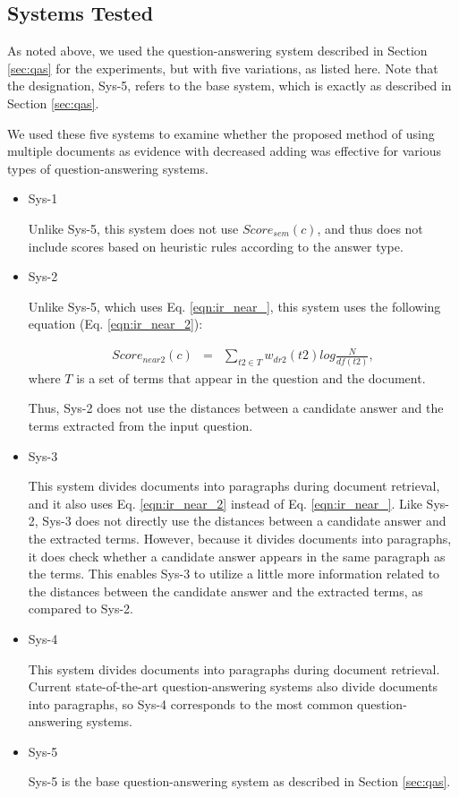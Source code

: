 \subsection{Systems Tested}
\label{sec:exp_system}

As noted above, we used the question-answering system 
described in Section \ref{sec:qas} for the experiments, 
but with five variations, as listed here. 
Note that the designation, Sys-5, refers to the base system, which is exactly as described in Section \ref{sec:qas}. 

We used these five systems 
to examine whether the proposed method
of using multiple documents as evidence with decreased adding
was effective for various types of question-answering systems. 

\begin{itemize}
\item 
  Sys-1
  
  Unlike Sys-5, this system does not use $Score_{sem}(c)$, and
  thus does not include scores based on heuristic rules according to the answer type.

\item 
  Sys-2

  Unlike Sys-5, which uses Eq. \ref{eqn:ir_near_}, 
  this system uses the following equation (Eq. \ref{eqn:ir_near_2}):
  
{
\begin{eqnarray}
  \label{eqn:ir_near_2}
Score_{near2}(c) & =  & \displaystyle \sum_{t2 \in T} w_{dr2}(t2) log \frac{N}{df(t2)}, 
\end{eqnarray}}
where $T$ is a set of terms that appear in the question and the document.

Thus, Sys-2 does not use 
the distances between a candidate answer and the terms extracted from the input question. 

\item 
  Sys-3

  This system divides documents into paragraphs during document retrieval, 
  and it also uses Eq. \ref{eqn:ir_near_2} instead of Eq. \ref{eqn:ir_near_}. 
  Like Sys-2, Sys-3 does not directly use 
  the distances between a candidate answer and the extracted terms. 
  However, because it divides documents into paragraphs, 
  it does check whether a candidate answer appears in the same paragraph as the terms. 
  This enables 
  Sys-3 to utilize a little more information related to 
  the distances between the candidate answer and the extracted terms, as compared to Sys-2. 

\item 
  Sys-4

  This system divides documents into paragraphs during document retrieval. 
  Current state-of-the-art question-answering systems 
  also divide documents into paragraphs, 
  so Sys-4 corresponds to the most common question-answering systems. 

\item
  Sys-5
  
  Sys-5 is the base question-answering system as described in Section \ref{sec:qas}. 

\end{itemize}

